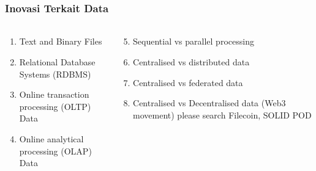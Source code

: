 \documentclass[aspectratio=169, table]{beamer}
\begin{document}
	
	
	
	
	\begin{frame}
		\frametitle{Inovasi Terkait Data}
		\framesubtitle{\hspace{1cm}}
		\begin{columns}
			\begin{column}{0.5\textwidth}
				\begin{center}
					\begin{enumerate}
						\item Text and Binary Files
						\item Relational Database Systems (RDBMS)
						\item Online transaction processing (OLTP) Data
						\item Online analytical processing (OLAP) Data
					
					\end{enumerate}
				\end{center}
			\end{column}
			\begin{column}{0.5\textwidth}
				\begin{center}
					\begin{enumerate}
						\setcounter{enumi}{4}
						
						\item Sequential vs parallel processing
						\item Centralised vs distributed data
						\item Centralised vs federated data
						\item Centralised vs Decentralised data (Web3 movement) please search Filecoin, SOLID POD
					\end{enumerate}
				\end{center}
			\end{column}
		\end{columns}
	\end{frame}
	
\end{document}
